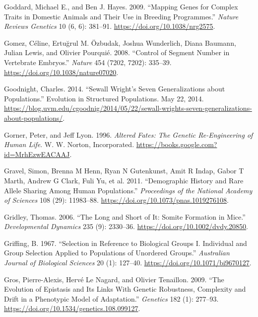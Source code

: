 \documentclass[
]{book}
\newlength{\cslhangindent}
\newlength{\cslentryspacingunit} %
\newenvironment{CSLReferences}[2] %
 {%
  \setlength{\parindent}{0pt}
  \ifodd #1
  \let\oldpar\par
  \def\par{\hangindent=\cslhangindent\oldpar}
  \fi
  \setlength{\parskip}{#2\cslentryspacingunit}
 }%
 {}
\begin{document}
\begin{CSLReferences}{1}{0}
\leavevmode{}%
Goddard, Michael E., and Ben J. Hayes. 2009. {``Mapping Genes for Complex Traits in Domestic Animals and Their Use in Breeding Programmes.''} \emph{Nature Reviews Genetics} 10 (6, 6): 381--91. \url{https://doi.org/10.1038/nrg2575}.

\leavevmode{}%
Gomez, Céline, Ertuğrul M. Özbudak, Joshua Wunderlich, Diana Baumann, Julian Lewis, and Olivier Pourquié. 2008. {``Control of Segment Number in Vertebrate Embryos.''} \emph{Nature} 454 (7202, 7202): 335--39. \url{https://doi.org/10.1038/nature07020}.

\leavevmode{}%
Goodnight, Charles. 2014. {``Sewall {Wright}'s {Seven Generalizations} about {Populations}.''} {Evolution in Structured Populations}. May 22, 2014. \url{https://blog.uvm.edu/cgoodnig/2014/05/22/sewall-wrights-seven-generalizations-about-populations/}.

\leavevmode{}%
Gorner, Peter, and Jeff Lyon. 1996. \emph{Altered {Fates}: {The Genetic Re-Engineering} of {Human Life}}. {W. W. Norton, Incorporated}. \url{https://books.google.com?id=MrhEzwEACAAJ}.

\leavevmode{}%
Gravel, Simon, Brenna M Henn, Ryan N Gutenkunst, Amit R Indap, Gabor T Marth, Andrew G Clark, Fuli Yu, et al. 2011. {``Demographic History and Rare Allele Sharing Among Human Populations.''} \emph{Proceedings of the National Academy of Sciences} 108 (29): 11983--88. \url{https://doi.org/10.1073/pnas.1019276108}.

\leavevmode{}%
Gridley, Thomas. 2006. {``The Long and Short of It: {Somite} Formation in Mice.''} \emph{Developmental Dynamics} 235 (9): 2330--36. \url{https://doi.org/10.1002/dvdy.20850}.

\leavevmode{}%
Griffing, B. 1967. {``Selection in {Reference} to {Biological Groups I}. {Individual} and {Group Selection Applied} to {Populations} of {Unordered Groups}.''} \emph{Australian Journal of Biological Sciences} 20 (1): 127--40. \url{https://doi.org/10.1071/bi9670127}.

\leavevmode{}%
Gros, Pierre-Alexis, Hervé Le Nagard, and Olivier Tenaillon. 2009. {``The {Evolution} of {Epistasis} and {Its Links With Genetic Robustness}, {Complexity} and {Drift} in a {Phenotypic Model} of {Adaptation}.''} \emph{Genetics} 182 (1): 277--93. \url{https://doi.org/10.1534/genetics.108.099127}.


\end{CSLReferences}
\end{document}
